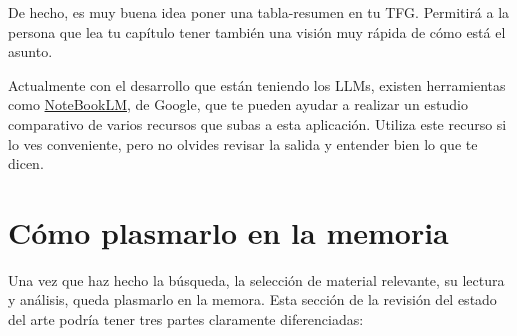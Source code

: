 De hecho, es muy buena idea poner una tabla-resumen en tu TFG. Permitirá a la persona que lea tu capítulo tener también una visión muy rápida de cómo está el asunto.

Actualmente con el desarrollo que están teniendo los LLMs, existen herramientas como \href{https://notebooklm.google}{NoteBookLM}, de Google, que te pueden ayudar a realizar un estudio comparativo de varios recursos que subas a esta aplicación. Utiliza este recurso si lo ves conveniente, pero no olvides revisar la salida y entender bien lo que te dicen.

\section{Cómo plasmarlo en la memoria}

Una vez que haz hecho la búsqueda, la selección de material relevante, su lectura y análisis, queda plasmarlo en la memora. Esta sección de la revisión del estado del arte podría tener tres partes claramente diferenciadas:


